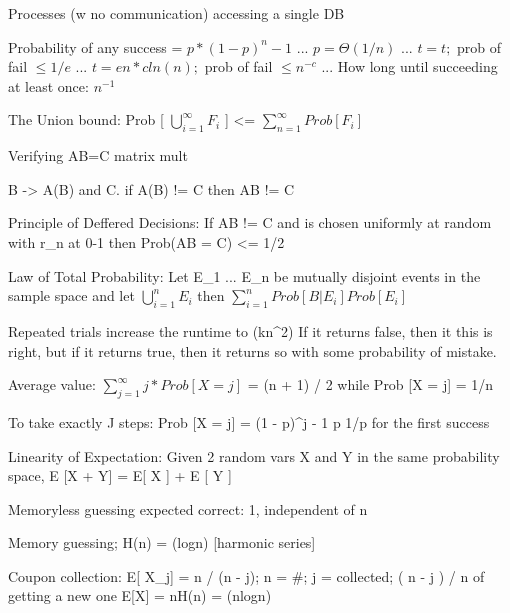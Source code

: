 
Processes (w no communication) accessing a single DB

Probability of any success =  $p* (1 - p) ^ n-1 $ ...
$p = \Theta(1/n)$ ...
$t = t;$ prob of fail $\leq 1/e$ ...
$t = en*cln(n);$ prob of fail $\leq n^{-c}$ ...
How long until succeeding at least once: $n^{-1}$

The Union bound: Prob [ $\bigcup\limits_{i=1}^{\infty} F_{i}$ ] <= $\sum_{n=1}^{\infty}  Prob[ F_{i}] $ 


Verifying AB=C matrix mult

B -> A(B) and C. if A(B) != C then AB != C

Principle of Deffered Decisions: If AB != C and  is chosen uniformly at random with r_n at 0-1 then Prob(AB = C) <= 1/2

Law of Total Probability: Let E_1 ... E_n be mutually disjoint events in the sample space \Omega and let $\bigcup\limits_{i=1}^{n} E_{i}$ then $\sum_{i=1}^{n}  Prob[ B | E_{i}] Prob[E_{i}] $ 

Repeated trials increase the runtime to \Theta(kn^2)
If it returns false, then it this is right, but if it returns true, then it returns so with some probability of mistake.


Average value: $\sum_{j=1}^{\infty}  j * Prob[ X = j ] $ = (n + 1) / 2 while Prob [X = j] = 1/n

To take exactly J steps: Prob [X = j] = (1 - p)^{j - 1} p
1/p for the first success

Linearity of Expectation: Given 2 random vars X and Y in the same probability space, E [X + Y] = E[ X ] + E [ Y ] 

Memoryless guessing expected correct: 1, independent of n

Memory guessing; H(n) = \Theta(logn) [harmonic series]

Coupon collection: E[ X_{j}] = n / (n - j); n = #; j = collected; ( n - j ) / n of getting a new one
E[X] = nH(n) = \Theta(nlogn)
